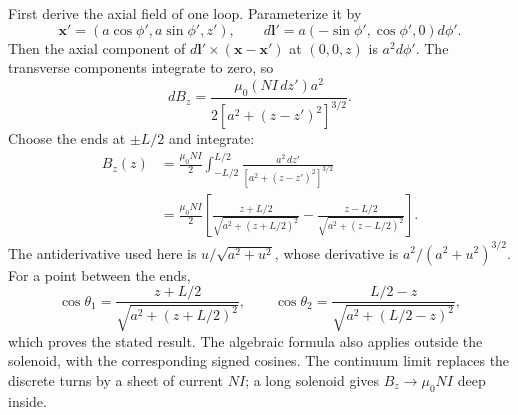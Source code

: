 \begin{center}
\end{center}
\solution
First derive the axial field of one loop. Parameterize it by
\[
\mathbf x'=(a\cos\phi',a\sin\phi',z'),\qquad
d\mathbf l'=a(-\sin\phi',\cos\phi',0)d\phi'.
\]
Then
the axial component of $d\mathbf l'\times(\mathbf x-\mathbf x')$
at $(0,0,z)$ is $a^2d\phi'$. The transverse components integrate to zero,
so
\[
dB_z=\frac{\mu_0(NI\,dz')a^2}
{2[a^2+(z-z')^2]^{3/2}}.
\]
Choose the ends at $\pm L/2$ and integrate:
\[
\begin{split}
B_z(z)&=\frac{\mu_0NI}{2}\int_{-L/2}^{L/2}
\frac{a^2\,dz'}{[a^2+(z-z')^2]^{3/2}}\\
&=\frac{\mu_0NI}{2}
\left[\frac{z+L/2}{\sqrt{a^2+(z+L/2)^2}}
-\frac{z-L/2}{\sqrt{a^2+(z-L/2)^2}}\right].
\end{split}
\]
The antiderivative used here is
$u/\sqrt{a^2+u^2}$, whose derivative is $a^2/(a^2+u^2)^{3/2}$.
For a point between the ends,
\[
\cos\theta_1=\frac{z+L/2}{\sqrt{a^2+(z+L/2)^2}},\qquad
\cos\theta_2=\frac{L/2-z}{\sqrt{a^2+(L/2-z)^2}},
\]
which proves the stated result. The algebraic formula also applies
outside the solenoid, with the corresponding signed cosines.
The continuum limit replaces the discrete turns by a sheet of current
$NI$; a long solenoid gives $B_z\to\mu_0NI$ deep inside.


